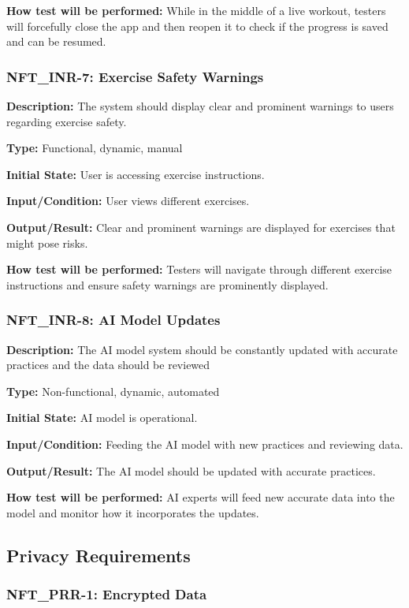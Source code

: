 \documentclass[12pt, titlepage]{article}
\begin{document}
\textbf{How test will be performed: }While in the middle of a live workout, testers will forcefully close the app and then reopen it to check if the progress is saved and can be resumed.


\subsubsection*{\textbf{NFT\_INR-7: Exercise Safety Warnings}
}

\textbf{Description: }The system should display clear and prominent warnings to users regarding exercise safety.

\textbf{Type: }Functional, dynamic, manual

\textbf{Initial State:} User is accessing exercise instructions.

\textbf{Input/Condition: }User views different exercises.

\textbf{Output/Result:} Clear and prominent warnings are displayed for exercises that might pose risks.

\textbf{How test will be performed: }Testers will navigate through different exercise instructions and ensure safety warnings are prominently displayed.


\subsubsection*{\textbf{NFT\_INR-8: AI Model Updates}
}

\textbf{Description: }The AI model system should be constantly updated with accurate practices and the data should be reviewed

\textbf{Type: }Non-functional, dynamic, automated

\textbf{Initial State:} AI model is operational.

\textbf{Input/Condition:} Feeding the AI model with new practices and reviewing data.

\textbf{Output/Result:} The AI model should be updated with accurate practices.

\textbf{How test will be performed:} AI experts will feed new accurate data into the model and monitor how it incorporates the updates.
\newline
\subsection{Privacy Requirements}


\subsubsection*{\textbf{NFT\_PRR-1: Encrypted Data}
}
\end{document}
